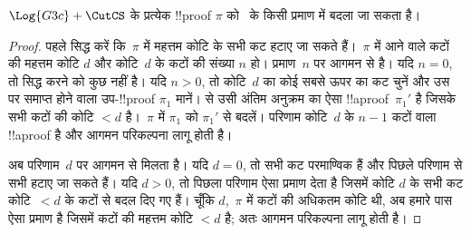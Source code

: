 \documentclass[../../../include/open-logic-section]{subfiles}
\begin{document}
\begin{thm}
$\Log{G3c} + \CutCS$ के प्रत्येक !!{proof} $\pi$ को~ के किसी प्रमाण
में बदला जा सकता है।
\end{thm}

\begin{proof}
  पहले सिद्ध करें कि~$\pi$ में महत्तम कोटि के सभी कट हटाए जा सकते हैं।~$\pi$
  में आने वाले कटों की महत्तम कोटि $d$ और कोटि~$d$ के कटों की संख्या $n$ हो।
  प्रमाण~$n$ पर आगमन से है। यदि $n=0$, तो सिद्ध करने को कुछ नहीं है। यदि
  $n>0$, तो कोटि~$d$ का कोई सबसे ऊपर का कट चुनें और उस पर समाप्त होने वाला
  उप-!!{proof} $\pi_1$ मानें।  से उसी अंतिम अनुक्रम
  का ऐसा !!a{proof}~$\pi_1'$ है जिसके सभी कटों की कोटि $<d$ है।~$\pi$ में
  $\pi_1$ को $\pi_1'$ से बदलें। परिणाम कोटि~$d$ के $n-1$ कटों वाला !!a{proof}
  है और आगमन परिकल्पना लागू होती है।

  अब परिणाम~$d$ पर आगमन से मिलता है। यदि $d=0$, तो सभी कट परमाण्विक हैं और
  पिछले परिणाम से सभी हटाए जा सकते हैं। यदि $d>0$, तो पिछला परिणाम ऐसा प्रमाण
  देता है जिसमें कोटि $d$ के सभी कट कोटि~$<d$ के कटों से बदल दिए गए हैं। चूँकि
  $d$,~$\pi$ में कटों की अधिकतम कोटि थी, अब हमारे पास ऐसा प्रमाण है जिसमें
  कटों की महत्तम कोटि $<d$ है; अतः आगमन परिकल्पना लागू होती है।
\end{proof}
\end{document}
